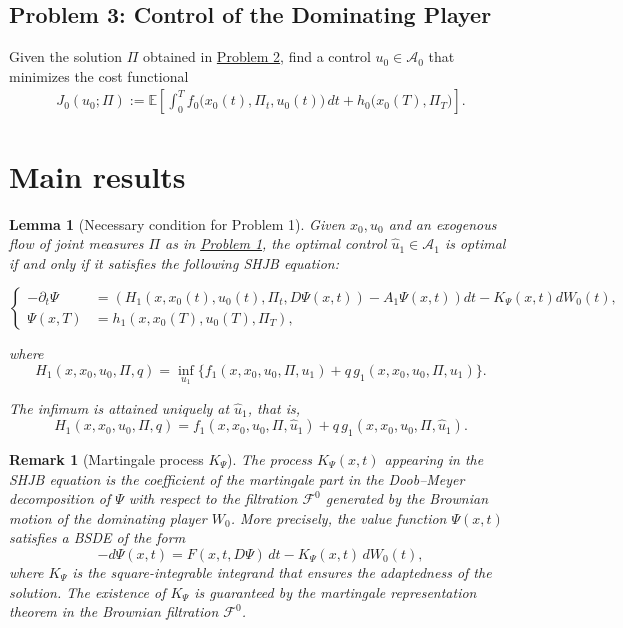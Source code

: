 \documentclass[12pt]{article}
\newtheorem{lema}[teo]{Lemma}
\newtheorem*{obs*}{Remark}
\theoremstyle{definition}
\begin{document}
\subsection{Problem 3: Control of the Dominating Player}
\label{Problem3}
Given the solution \(\Pi\) obtained in \hyperref[Problem2]{Problem 2}, find a control \(u_0\in\mathcal{A}_0\) that minimizes the cost functional
\begin{equation}
    \label{Problema 23}
    \begin{aligned}
    J_0(u_0;\Pi)
    := \mathbb{E}\left[\int_0^T f_0\big(x_0(t), \Pi_t, u_0(t)\big)\,dt
    + h_0\big(x_0(T),\Pi_T\big)\right].
    \end{aligned}
\end{equation}

\section{Main results}

\begin{lema}[Necessary condition for Problem 1]
    \label{lema:condicion_necesaria_problema1}
    Given \( x_0, u_0 \) and an exogenous flow of joint measures \(\Pi\) as in \hyperref[Problem1]{Problem 1}, the optimal control \( \hat{u}_1 \in \mathcal{A}_1 \) is optimal if and only if it satisfies the following SHJB equation:

\[
\left\{
\begin{aligned}
    -\partial_t \Psi &= \left( H_1(x, x_0(t), u_0(t), \Pi_t, D\Psi(x,t)) - A_1 \Psi(x,t) \right) dt - K_\Psi(x,t) dW_0(t), \\
    \Psi(x,T) &= h_1 \left( x, x_0(T), u_0(T), \Pi_T \right),
\end{aligned}
\right.
\]

where
\[
H_1(x, x_0, u_0, \Pi, q) = \inf_{u_1} \Big\{ f_1(x, x_0, u_0, \Pi, u_1) + q \, g_1(x, x_0, u_0, \Pi, u_1) \Big\}.
\]

The infimum is attained uniquely at \( \hat{u}_1 \), that is,
\[
H_1(x, x_0, u_0, \Pi, q) = f_1(x,x_0,u_0,\Pi,\hat{u}_1) + q\, g_1(x,x_0,u_0,\Pi,\hat{u}_1).
\]
\end{lema}

\begin{obs*}[Martingale process $K_\Psi$]
The process $K_\Psi(x,t)$ appearing in the SHJB equation is the coefficient of the martingale part in the Doob--Meyer decomposition of $\Psi$ with respect to the filtration $\mathcal{F}^0$ generated by the Brownian motion of the dominating player $W_0$. More precisely, the value function $\Psi(x,t)$ satisfies a BSDE of the form
$$-d\Psi(x,t) = F(x,t,D\Psi)\,dt - K_\Psi(x,t)\,dW_0(t),$$
where $K_\Psi$ is the square-integrable integrand that ensures the adaptedness of the solution. The existence of $K_\Psi$ is guaranteed by the martingale representation theorem in the Brownian filtration $\mathcal{F}^0$.
\end{obs*}
\end{document}
